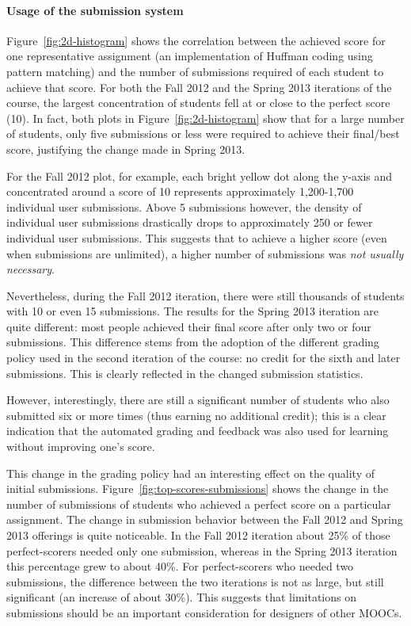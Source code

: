 \documentclass{sig-alternate}
\begin{document}
\paragraph{Usage of the submission system}

Figure~\ref{fig:2d-histogram} shows the correlation between the achieved
score for one representative assignment (an implementation of Huffman coding using
pattern matching) and the number of submissions required of each student to achieve that
score. For both the Fall 2012 and the Spring 2013 iterations of the course,
the largest concentration of students fell at or close to the perfect score
(10). In fact, both plots in Figure~\ref{fig:2d-histogram} show that
for a large number of students, only five submissions or less were required to
achieve their final/best score, justifying the change made in Spring 2013.

For the Fall 2012 plot, for example, each bright yellow dot
along the y-axis and concentrated around a score of 10 represents approximately 1,200-1,700
individual user submissions. Above 5 submissions however, the density of individual user submissions
drastically drops to approximately 250 or fewer individual user submissions.
This suggests that to achieve a higher score (even when submissions are unlimited),
a higher number of submissions was {\em not usually necessary}.

Nevertheless, during the Fall 2012 iteration, there were still thousands of students
with 10 or even 15 submissions. The results for the Spring 2013 iteration are
quite different: most people achieved their final score after only two or four
submissions. This difference stems from the adoption of the different grading policy used in
the second iteration of the course: no credit for
the sixth and later submissions. This is clearly reflected in the changed
submission statistics.

However, interestingly, there are still a significant
number of students who also submitted six or more times (thus earning no additional
credit); this is a clear indication that the automated grading and feedback
was also used for learning without improving one's score.

This change in the grading policy had an interesting effect on the quality of
initial submissions. Figure~\ref{fig:top-scores-submissions} shows the change
in the number of submissions of students who achieved a perfect score on a
particular assignment. The change in submission behavior between the Fall 2012
and Spring 2013 offerings is quite noticeable.
In the Fall 2012 iteration about 25\% of those perfect-scorers needed only one
submission, whereas in the Spring 2013 iteration this percentage grew to about
40\%. For perfect-scorers who needed two submissions, the difference between
the two iterations is not as large, but still significant (an increase of
about 30\%). This suggests that limitations on submissions should be an important consideration for designers of other MOOCs.
\end{document}
